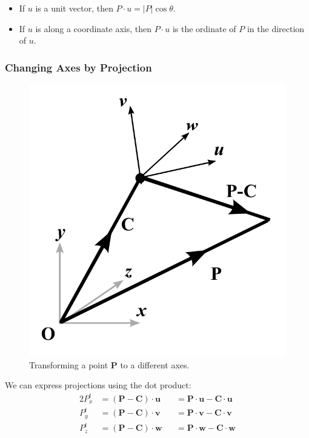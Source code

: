 \documentclass[11pt]{article}
\begin{document}
\begin{itemize}
  \item If $u$ is a unit vector, then $P \cdot u = \lvert P \rvert \cos \theta$.
  \item If $u$ is along a coordinate axis, then $P \cdot u$ is the ordinate of $P$ in the direction of $u$.
\end{itemize}

\subsubsection{Changing Axes by Projection}
\begin{figure}[h]
  \caption{Transforming a point $\textbf{P}$ to a different axes.}
  \includegraphics[scale=0.2]{changingaxes}
  \centering
\end{figure}

We can express projections using the dot product:
\begin{alignat*}{2}
  P_x^t &= (\textbf{P} - \textbf{C}) \cdot \textbf{u} &&= \textbf{P} \cdot \textbf{u} - \textbf{C} \cdot \textbf{u} \\
  P_y^t &= (\textbf{P} - \textbf{C}) \cdot \textbf{v} &&= \textbf{P} \cdot \textbf{v} - \textbf{C} \cdot \textbf{v} \\
  P_z^t &= (\textbf{P} - \textbf{C}) \cdot \textbf{w} &&= \textbf{P} \cdot \textbf{w} - \textbf{C} \cdot \textbf{w}
\end{alignat*}
\end{document}

